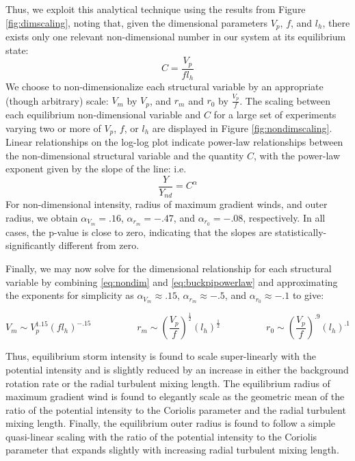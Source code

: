 \documentclass[12pt]{article}
\begin{document}
Thus, we exploit this analytical technique using the results from Figure \ref{fig:dimscaling}, noting that, given the dimensional parameters $V_p$, $f$, and $l_h$, there exists only one relevant non-dimensional number in our system at its equilibrium state:
\begin{equation}
\label{eq:nondim}
C = \frac{V_p}{fl_h}
\end{equation}
We choose to non-dimensionalize each structural variable by an appropriate (though arbitrary) scale: $V_m$ by $V_p$, and $r_m$ and $r_0$ by $\frac{V_p}{f}$. The scaling between each equilibrium non-dimensional variable and $C$ for a large set of experiments varying two or more of $V_p$, $f$, or $l_h$ are displayed in Figure \ref{fig:nondimscaling}. Linear relationships on the log-log plot indicate power-law relationships between the non-dimensional structural variable and the quantity $C$, with the power-law exponent given by the slope of the line: i.e.
\begin{equation}
\label{eq:buckpipowerlaw}
\frac{Y}{Y_{nd}} = C^\alpha
\end{equation}
For non-dimensional intensity, radius of maximum gradient winds, and outer radius, we obtain $\alpha_{V_m} = .16$, $\alpha_{r_m} = -.47$, and $\alpha_{r_0} = -.08$, respectively. In all cases, the p-value is close to zero, indicating that the slopes are statistically-significantly different from zero.

Finally, we may now solve for the dimensional relationship for each structural variable by combining \eqref{eq:nondim} and \eqref{eq:buckpipowerlaw} and approximating the exponents for simplicity as $\alpha_{V_m} \approx .15$, $\alpha_{r_m} \approx -.5$, and $\alpha_{r_0} \approx -.1$ to give:

\begin{equation}
\label{eq:scalings}
V_m \sim V_p^{1.15}\left(fl_h\right)^{-.15} \hspace{2cm} r_m \sim \left(\frac{V_p}{f}\right)^\frac{1}{2}\left(l_h\right)^\frac{1}{2} \hspace{2cm} r_0 \sim \left(\frac{V_p}{f}\right)^{.9}\left(l_h\right)^{.1}
\end{equation}

 
Thus, equilibrium storm intensity is found to scale super-linearly with the potential intensity and is slightly reduced by an increase in either the background rotation rate or the radial turbulent mixing length. The equilibrium radius of maximum gradient wind is found to elegantly scale as the geometric mean of the ratio of the potential intensity to the Coriolis parameter and the radial turbulent mixing length.  Finally, the equilibrium outer radius is found to follow a simple quasi-linear scaling with the ratio of the potential intensity to the Coriolis parameter that expands slightly with increasing radial turbulent mixing length.
\end{document}
